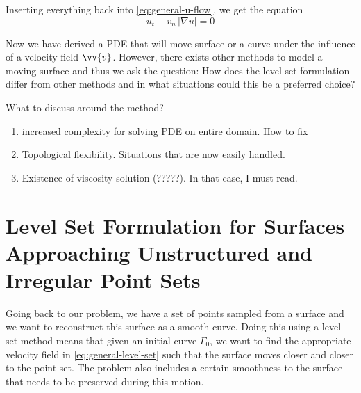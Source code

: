 Inserting everything back into \eqref{eq:general-u-flow}, we get the equation
\begin{equation}
    u_t - v_n\, |\nabla u| = 0
    \label{eq:general-level-set}
\end{equation}

Now we have derived a PDE that will move surface or a curve under the influence
of a velocity field $\vv{v}$. However, there exists other methods to model
a moving surface and thus we ask the question: How does the level set 
formulation differ from other methods and in what situations could this be 
a preferred choice?




What to discuss around the method?
\begin{enumerate}
    \item increased complexity for solving PDE on entire domain. How to fix
    \item Topological flexibility. Situations that are now easily handled.
    \item Existence of viscosity solution (?????). In that case, I must read.
\end{enumerate}

\newpage
\section{Level Set Formulation for Surfaces Approaching Unstructured and Irregular Point Sets}
Going back to our problem, we have a set of points sampled from a surface and we want to
reconstruct this surface as a smooth curve. Doing this using
a level set method means that given an initial curve $\Gamma_0$, we want to find the 
appropriate velocity field in \eqref{eq:general-level-set} such that the surface moves
closer and closer to the point set. The problem also includes a certain smoothness to 
the surface that needs to be preserved during this motion.


